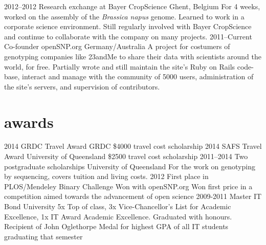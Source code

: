 \documentclass[]{friggeri-cv} %
\begin{document}
\begin{entrylist}
\entry
{2012--2012}
{Research exchange {\normalfont at Bayer CropScience}}
{Ghent, Belgium}
{For 4 weeks, worked on the assembly of the \textit{Brassica napus} genome. Learned to work in a corporate science environment. Still regularly involved with Bayer CropScience and continue to collaborate with the company on many projects.}
\entry
{2011--Current}
{Co-founder openSNP.org}
{Germany/Australia}
{A project for costumers of genotyping companies like 23andMe to share their data with scientists around the world, for free. Partially wrote and still maintain the site's Ruby on Rails code-base, interact and manage with the community of 5000 users, administration of the site's servers, and supervision of contributors.}


\end{entrylist}


\section{awards}

\begin{entrylist}
\entry
{2014}
{GRDC Travel Award}
{GRDC}
{\$4000 travel cost scholarship}
\entry
{2014}
{SAFS Travel Award}
{University of Queensland}
{\$2500 travel cost scholarship}
\entry
{2011--2014}
{Two postgraduate scholarships}
{University of Queensland}
{For the work on genotyping by sequencing, covers tuition and living costs.}
\entry
{2012}
{First place in PLOS/Mendeley Binary Challenge}
{Won with openSNP.org}
{Won first price in a competition aimed towards the advancement of open science}
\entry
{2009-2011}
{Master IT}
{Bond University}
{5x Top of class,  3x Vice-Chancellor's List for Academic Excellence, 1x IT Award Academic Excellence. Graduated with honours. Recipient of John Oglethorpe Medal for highest GPA of all IT students graduating that semester}
\end{entrylist}
\end{document}
